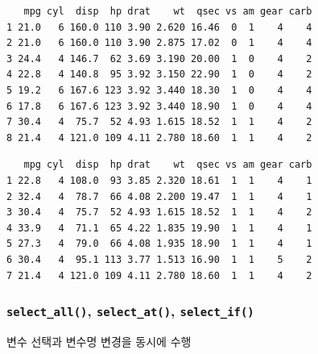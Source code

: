 \documentclass[
  11pt,
]{krantz}
\makeatletter
\newenvironment{Shaded}{\begin{snugshade}}{\end{snugshade}}
\newcommand{\CommentTok}[1]{\textcolor[rgb]{0.37,0.37,0.37}{\textit{#1}}}
\newcommand{\DecValTok}[1]{\textcolor[rgb]{0.06,0.06,0.06}{#1}}
\newcommand{\KeywordTok}[1]{\textcolor[rgb]{0.27,0.27,0.27}{\textbf{#1}}}
\newcommand{\NormalTok}[1]{#1}
\newcommand{\OperatorTok}[1]{\textcolor[rgb]{0.43,0.43,0.43}{\textbf{#1}}}
\newcommand{\StringTok}[1]{\textcolor[rgb]{0.5,0.5,0.5}{#1}}
\newenvironment{kframe}{%
\medskip{}
\setlength{\fboxsep}{.8em}
 \def\at@end@of@kframe{}%
 \ifinner\ifhmode%
  \def\at@end@of@kframe{\end{minipage}}%
  \begin{minipage}{\columnwidth}%
 \fi\fi%
 \def\FrameCommand##1{\hskip\@totalleftmargin \hskip-\fboxsep
 \colorbox{shadecolor}{##1}\hskip-\fboxsep
     \hskip-\linewidth \hskip-\@totalleftmargin \hskip\columnwidth}%
 \MakeFramed {\advance\hsize-\width
   \@totalleftmargin\z@ \linewidth\hsize
   \@setminipage}}%
 {\par\unskip\endMakeFramed%
 \at@end@of@kframe}
\renewenvironment{quote}{\begin{kframe}}{\end{kframe}}
\makeatother
\begin{document}
\begin{verbatim}
   mpg cyl  disp  hp drat    wt  qsec vs am gear carb
1 21.0   6 160.0 110 3.90 2.620 16.46  0  1    4    4
2 21.0   6 160.0 110 3.90 2.875 17.02  0  1    4    4
3 24.4   4 146.7  62 3.69 3.190 20.00  1  0    4    2
4 22.8   4 140.8  95 3.92 3.150 22.90  1  0    4    2
5 19.2   6 167.6 123 3.92 3.440 18.30  1  0    4    4
6 17.8   6 167.6 123 3.92 3.440 18.90  1  0    4    4
7 30.4   4  75.7  52 4.93 1.615 18.52  1  1    4    2
8 21.4   4 121.0 109 4.11 2.780 18.60  1  1    4    2
\end{verbatim}

\begin{Shaded}
\end{Shaded}

\begin{verbatim}
   mpg cyl  disp  hp drat    wt  qsec vs am gear carb
1 22.8   4 108.0  93 3.85 2.320 18.61  1  1    4    1
2 32.4   4  78.7  66 4.08 2.200 19.47  1  1    4    1
3 30.4   4  75.7  52 4.93 1.615 18.52  1  1    4    2
4 33.9   4  71.1  65 4.22 1.835 19.90  1  1    4    1
5 27.3   4  79.0  66 4.08 1.935 18.90  1  1    4    1
6 30.4   4  95.1 113 3.77 1.513 16.90  1  1    5    2
7 21.4   4 121.0 109 4.11 2.780 18.60  1  1    4    2
\end{verbatim}

\normalsize

\hypertarget{select-variant}{%
\subsubsection*{\texorpdfstring{\texttt{select\_all()}, \texttt{select\_at()}, \texttt{select\_if()}}{select\_all(), select\_at(), select\_if()}}\label{select-variant}}


\begin{quote}
변수 선택과 변수명 변경을 동시에 수행
\end{quote}
\end{document}
